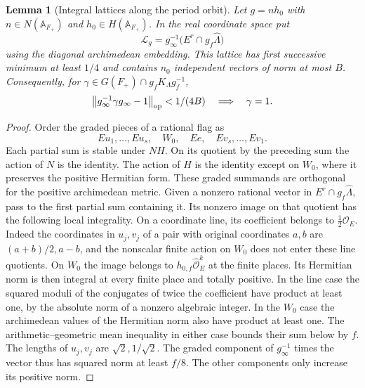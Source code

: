 \documentclass[a4paper,11pt]{article}
\newtheorem{lemma}[proposition]{Lemma}
\theoremstyle{definition}
\theoremstyle{remark}
\numberwithin{equation}{section}
\newcommand{\OO}{\mathcal O}
\begin{document}
\begin{lemma}[Integral lattices along the period orbit]\label{lem:inj96}
Let \(g=nh_0\) with \(n\in N(\mathbb A_{F_+})\) and
\(h_0\in H(\mathbb A_{F_+})\). In the real coordinate space put
\[
 {\mathcal L}_g=g_\infty^{-1}
       \bigl(E^r\cap g_f\widehat\Lambda\bigr)
\]
using the diagonal archimedean embedding. This lattice has first
successive minimum at least \(1/4\) and contains \(n_0\) independent
vectors of norm at most \(B\). Consequently, for
\(\gamma\in G(F_+)\cap g_fK_\Lambda g_f^{-1}\),
\[
 \big\|g_\infty^{-1}\gamma g_\infty-1\big\|_{\rm op}<1/(4B)
                    \quad\Longrightarrow\quad \gamma=1 .
\]
\end{lemma}
\begin{proof}
Order the graded pieces of a rational flag as
\[
 Eu_1,\ldots,Eu_s,\quad W_0,\quad Ee,\quad Ev_s,\ldots,Ev_1.
\]
Each partial sum is stable under \(NH\). On its quotient by the
preceding sum the action of \(N\) is the identity. The action of
\(H\) is the identity except on \(W_0\), where it preserves the
positive Hermitian form. These graded summands are orthogonal for
the positive archimedean metric. Given a nonzero rational vector
in \(E^r\cap g_f\widehat\Lambda\), pass to the first partial sum
containing it. Its nonzero image on that quotient has the following
local integrality. On a coordinate line, its coefficient belongs
to \(\tfrac12\OO_E\). Indeed the coordinates in \(u_j,v_j\)
of a pair with original coordinates \(a,b\) are
\((a+b)/2,a-b\), and the nonscalar finite action on \(W_0\)
does not enter these line quotients. On \(W_0\) the image belongs
to \(h_{0,f}\widehat{\OO}_E^k\) at the finite places. Its
Hermitian norm is then integral at every finite place and totally
positive. In the line case the squared moduli of the conjugates
of twice the coefficient have product at least one, by the
absolute norm of a nonzero algebraic integer. In the \(W_0\) case
the archimedean values of the Hermitian norm also have product at
least one. The arithmetic--geometric mean inequality in either
case bounds their sum below by \(f\). The lengths of \(u_j,v_j\)
are \(\sqrt2,1/\sqrt2\). The graded component of
\(g_\infty^{-1}\) times the vector thus has squared norm at least
\(f/8\). The other components only increase its positive norm.


\end{proof}
\end{document}
